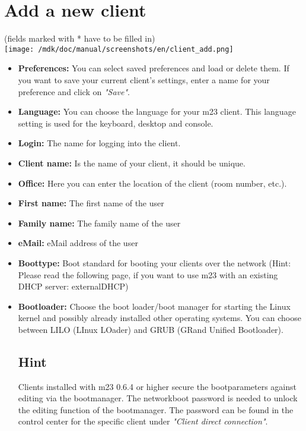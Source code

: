 \section{Add a new client}(fields marked  with * have to be filled in)\\
\texttt{[image: /mdk/doc/manual/screenshots/en/client\_add.png]} \\
\begin{itemize}
\item \textbf{Preferences:} You can select saved preferences and load or delete them. If you want to save your current client's settings, enter a name for your preference and click on \textit{"Save"}.\\
\item \textbf{Language:} You can choose the language for your m23 client. This language setting is used for the keyboard, desktop and console.\\
\item \textbf{Login:} The name for logging into the client.\\
\item \textbf{Client name:} Is the name of your client, it should be unique.\\
\item \textbf{Office:} Here you can enter the location of the client (room number, etc.).\\
\item \textbf{First name:} The first name of the user\\
\item \textbf{Family name:} The family name of the user\\
\item \textbf{eMail:} eMail address of the user\\
\item \textbf{Boottype:} Boot standard for booting your clients over the network (Hint: Please read the following page, if you want to use m23 with an existing DHCP server: externalDHCP)\\
\item \textbf{Bootloader:} Choose the boot loader/boot manager for starting the Linux kernel and possibly already installed other operating systems. You can choose between LILO (LInux LOader) and GRUB (GRand Unified Bootloader).\subsection{Hint}
Clients installed with m23 0.6.4 or higher secure the bootparameters against editing via the bootmanager. The networkboot password is needed to unlock the editing function of the bootmanager. The password can be found in the control center for the specific client under \textit{"Client direct connection"}.\\

\end{itemize}
